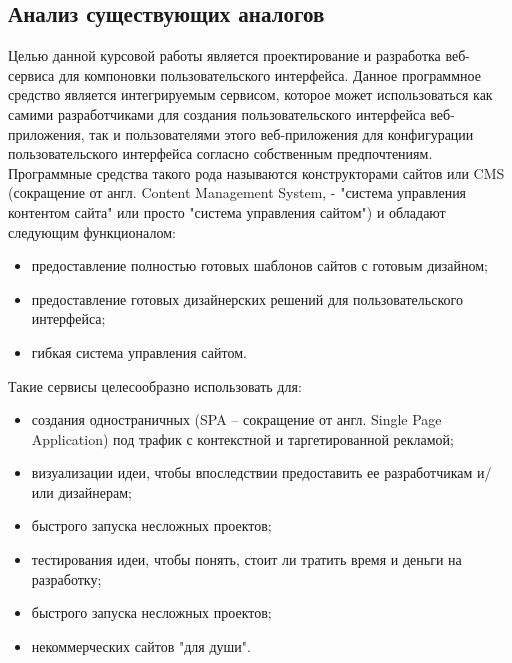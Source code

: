 \subsection{Анализ существующих аналогов}
\label{sec:analysis:analogues}

Целью данной курсовой работы является проектирование и разработка веб-сервиса для компоновки пользовательского интерфейса. 
Данное программное средство является интегрируемым сервисом, которое может использоваться как самими разработчиками для создания пользовательского интерфейса веб-приложения, так и пользователями этого веб-приложения для конфигурации пользовательского интерфейса согласно собственным предпочтениям.
Программные средства такого рода называются конструкторами сайтов или CMS (сокращение от англ. Content Management System, - "система управления контентом сайта" или просто "система управления сайтом") и обладают следующим функционалом:

\begin{itemize}
    \item предоставление полностью готовых шаблонов сайтов с готовым дизайном;
    \item предоставление готовых дизайнерских решений для пользовательского интерфейса;
    \item гибкая система управления сайтом.
\end{itemize}

Такие сервисы целесообразно использовать для:
\begin{itemize}
    \item создания одностраничных (SPA – сокращение от англ. Single Page Application) под трафик с контекстной и таргетированной рекламой;
    \item визуализации идеи, чтобы впоследствии предоставить ее разработчикам и/или дизайнерам;
    \item быстрого запуска несложных проектов;
    \item тестирования идеи, чтобы понять, стоит ли тратить время и деньги на разработку;
    \item быстрого запуска несложных проектов;
    \item некоммерческих сайтов "для души".
\end{itemize}	

